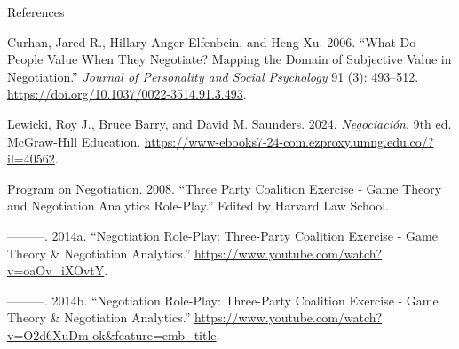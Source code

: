 \documentclass[
  ignorenonframetext,
]{beamer}
\newlength{\cslhangindent}
\newenvironment{CSLReferences}[2] %
 {\begin{list}{}{%
  \setlength{\itemindent}{0pt}
  \setlength{\leftmargin}{0pt}
  \setlength{\parsep}{0pt}
  \ifodd #1
   \setlength{\leftmargin}{\cslhangindent}
   \setlength{\itemindent}{-1\cslhangindent}
  \fi
  \setlength{\itemsep}{#2\baselineskip}}}
 {\end{list}}
\begin{document}
\begin{frame}[allowframebreaks]{References}
\label{refs}
\begin{CSLReferences}{1}{0}
Curhan, Jared R., Hillary Anger Elfenbein, and Heng Xu. 2006. {``What Do
People Value When They Negotiate? {Mapping} the Domain of Subjective
Value in Negotiation.''} \emph{Journal of Personality and Social
Psychology} 91 (3): 493--512.
\url{https://doi.org/10.1037/0022-3514.91.3.493}.

Lewicki, Roy J., Bruce Barry, and David M. Saunders. 2024.
\emph{Negociación}. 9th ed. McGraw-Hill Education.
\url{https://www-ebooks7-24-com.ezproxy.umng.edu.co/?il=40562}.

Program on Negotiation. 2008. {``Three {Party} {Coalition} {Exercise} -
{Game} {Theory} and {Negotiation} {Analytics} {Role}-{Play}.''} Edited
by Harvard Law School.

---------. 2014a. {``Negotiation {Role}-{Play}: {Three}-{Party}
{Coalition} {Exercise} - {Game} {Theory} \& {Negotiation}
{Analytics}.''} \url{https://www.youtube.com/watch?v=oaOv_iXOvtY}.

---------. 2014b. {``Negotiation {Role}-{Play}: {Three}-{Party}
{Coalition} {Exercise} - {Game} {Theory} \& {Negotiation}
{Analytics}.''}
\url{https://www.youtube.com/watch?v=O2d6XuDm-ok&feature=emb_title}.

\end{CSLReferences}
\end{frame}
\end{document}
